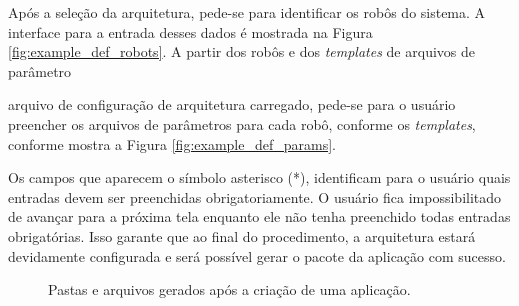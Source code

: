         Após a seleção da arquitetura, pede-se para identificar os robôs do sistema. A interface para a entrada desses dados é mostrada na Figura \ref{fig:example_def_robots}. A partir dos robôs e dos \textit{templates} de arquivos de parâmetro
        
        arquivo de configuração de arquitetura carregado, pede-se para o usuário preencher os arquivos de parâmetros para cada robô, conforme os \textit{templates}, conforme mostra a Figura \ref{fig:example_def_params}.
        
        Os campos que aparecem o símbolo asterisco (*), identificam para o usuário quais entradas devem ser preenchidas obrigatoriamente. O usuário fica impossibilitado de avançar para a próxima tela enquanto ele não tenha preenchido todas entradas obrigatórias. Isso garante que ao final do procedimento, a arquitetura estará devidamente configurada e será possível gerar o pacote da aplicação com sucesso.
        
        \begin{figure}[htb]
            \centering
            
            \caption{Pastas e arquivos gerados após a criação de uma aplicação.} \label{fig:example}
        \end{figure}
        
